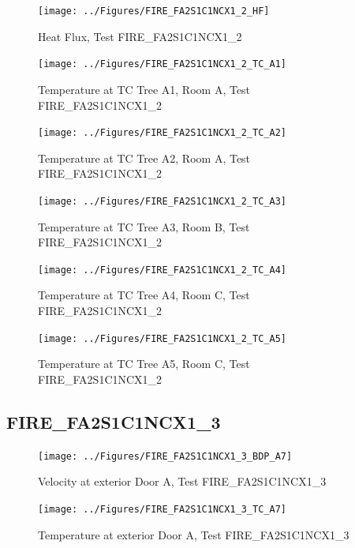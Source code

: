 \documentclass[11pt,oneside]{book}
\begin{document}
\begin{figure}[!ht]
\texttt{[image: ../Figures/FIRE\_FA2S1C1NCX1\_2\_HF]}
\caption{Heat Flux, Test FIRE\_FA2S1C1NCX1\_2}
\label{fig:FIRE_FA2S1C1NCX1_2_HF}
\end{figure}

\begin{figure}[!ht]
\texttt{[image: ../Figures/FIRE\_FA2S1C1NCX1\_2\_TC\_A1]}
\caption{Temperature at TC Tree A1, Room A, Test FIRE\_FA2S1C1NCX1\_2}
\label{fig:FIRE_FA2S1C1NCX1_2_TC_A1}
\end{figure}

\begin{figure}[!ht]
\texttt{[image: ../Figures/FIRE\_FA2S1C1NCX1\_2\_TC\_A2]}
\caption{Temperature at TC Tree A2, Room A, Test FIRE\_FA2S1C1NCX1\_2}
\label{fig:FIRE_FA2S1C1NCX1_2_TC_A2}
\end{figure}

\begin{figure}[!ht]
\texttt{[image: ../Figures/FIRE\_FA2S1C1NCX1\_2\_TC\_A3]}
\caption{Temperature at TC Tree A3, Room B, Test FIRE\_FA2S1C1NCX1\_2}
\label{fig:FIRE_FA2S1C1NCX1_2_TC_A3}
\end{figure}

\begin{figure}[!ht]
\texttt{[image: ../Figures/FIRE\_FA2S1C1NCX1\_2\_TC\_A4]}
\caption{Temperature at TC Tree A4, Room C, Test FIRE\_FA2S1C1NCX1\_2}
\label{fig:FIRE_FA2S1C1NCX1_2_TC_A4}
\end{figure}

\begin{figure}[!ht]
\texttt{[image: ../Figures/FIRE\_FA2S1C1NCX1\_2\_TC\_A5]}
\caption{Temperature at TC Tree A5, Room C, Test FIRE\_FA2S1C1NCX1\_2}
\label{fig:FIRE_FA2S1C1NCX1_2_TC_A5}
\end{figure}


\clearpage


\subsection{FIRE\_FA2S1C1NCX1\_3}

\begin{figure}[!ht]
\texttt{[image: ../Figures/FIRE\_FA2S1C1NCX1\_3\_BDP\_A7]}
\caption{Velocity at exterior Door A, Test FIRE\_FA2S1C1NCX1\_3}
\label{fig:FIRE_FA2S1C1NCX1_3_BDP_A7}
\end{figure}

\begin{figure}[!ht]
\texttt{[image: ../Figures/FIRE\_FA2S1C1NCX1\_3\_TC\_A7]}
\caption{Temperature at exterior Door A, Test FIRE\_FA2S1C1NCX1\_3}
\label{fig:FIRE_FA2S1C1NCX1_3_TC_A7}
\end{figure}
\end{document}
